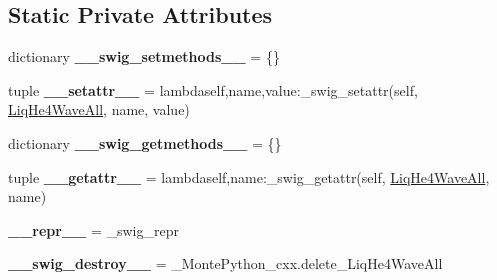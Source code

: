 \subsection*{Static Private Attributes}
\begin{DoxyCompactItemize}
\item 
\hypertarget{classMontePython__cxx_1_1LiqHe4WaveAll_abc2b9ddaaf865a79017f09d1a454f1d3}{}dictionary {\bfseries \+\_\+\+\_\+swig\+\_\+setmethods\+\_\+\+\_\+} = \{\}\label{classMontePython__cxx_1_1LiqHe4WaveAll_abc2b9ddaaf865a79017f09d1a454f1d3}

\item 
\hypertarget{classMontePython__cxx_1_1LiqHe4WaveAll_aa3811b2fb7a617f053955f12da379ac3}{}tuple {\bfseries \+\_\+\+\_\+setattr\+\_\+\+\_\+} = lambdaself,name,value\+:\+\_\+swig\+\_\+setattr(self, \hyperlink{classMontePython__cxx_1_1LiqHe4WaveAll}{Liq\+He4\+Wave\+All}, name, value)\label{classMontePython__cxx_1_1LiqHe4WaveAll_aa3811b2fb7a617f053955f12da379ac3}

\item 
\hypertarget{classMontePython__cxx_1_1LiqHe4WaveAll_af80389fc830cc73157fa4033f86b32f4}{}dictionary {\bfseries \+\_\+\+\_\+swig\+\_\+getmethods\+\_\+\+\_\+} = \{\}\label{classMontePython__cxx_1_1LiqHe4WaveAll_af80389fc830cc73157fa4033f86b32f4}

\item 
\hypertarget{classMontePython__cxx_1_1LiqHe4WaveAll_ae0d9f89b4040869884c71afcbf8d699f}{}tuple {\bfseries \+\_\+\+\_\+getattr\+\_\+\+\_\+} = lambdaself,name\+:\+\_\+swig\+\_\+getattr(self, \hyperlink{classMontePython__cxx_1_1LiqHe4WaveAll}{Liq\+He4\+Wave\+All}, name)\label{classMontePython__cxx_1_1LiqHe4WaveAll_ae0d9f89b4040869884c71afcbf8d699f}

\item 
\hypertarget{classMontePython__cxx_1_1LiqHe4WaveAll_ae7e542887537b26a14454059f61bb46c}{}{\bfseries \+\_\+\+\_\+repr\+\_\+\+\_\+} = \+\_\+swig\+\_\+repr\label{classMontePython__cxx_1_1LiqHe4WaveAll_ae7e542887537b26a14454059f61bb46c}

\item 
\hypertarget{classMontePython__cxx_1_1LiqHe4WaveAll_a0ab06b2c03abe239dd2b40a59a4048cf}{}{\bfseries \+\_\+\+\_\+swig\+\_\+destroy\+\_\+\+\_\+} = \+\_\+\+Monte\+Python\+\_\+cxx.\+delete\+\_\+\+Liq\+He4\+Wave\+All\label{classMontePython__cxx_1_1LiqHe4WaveAll_a0ab06b2c03abe239dd2b40a59a4048cf}

\end{DoxyCompactItemize}


